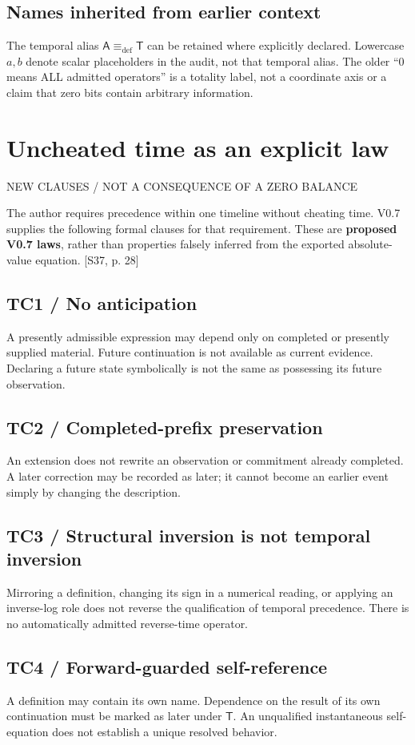 \documentclass[11pt,a4paper]{article}
\newcommand{\newsec}[2]{\clearpage\section{#1}{\sffamily\footnotesize\color{teal}\MakeUppercase{#2}\par}\vspace{5pt}}
\newcommand{\src}[1]{{\small\color{muted}[S37, #1]}}
\newcommand{\Ti}{\mathsf T}
\newcommand{\deq}{\mathrel{\equiv_{\mathrm{def}}}}
\begin{document}
\subsection{Names inherited from earlier context}
The temporal alias $\mathsf A\deq\Ti$ can be retained where explicitly declared. Lowercase $a,b$ denote scalar placeholders in the audit, not that temporal alias. The older ``0 means ALL admitted operators'' is a totality label, not a coordinate axis or a claim that zero bits contain arbitrary information.

\newsec{Uncheated time as an explicit law}{New clauses / not a consequence of a zero balance}
The author requires precedence within one timeline without cheating time. V0.7 supplies the following formal clauses for that requirement. These are \textbf{proposed V0.7 laws}, rather than properties falsely inferred from the exported absolute-value equation. \src{p. 28}

\subsection{TC1 / No anticipation}
A presently admissible expression may depend only on completed or presently supplied material. Future continuation is not available as current evidence. Declaring a future state symbolically is not the same as possessing its future observation.

\subsection{TC2 / Completed-prefix preservation}
An extension does not rewrite an observation or commitment already completed. A later correction may be recorded as later; it cannot become an earlier event simply by changing the description.

\subsection{TC3 / Structural inversion is not temporal inversion}
Mirroring a definition, changing its sign in a numerical reading, or applying an inverse-log role does not reverse the qualification of temporal precedence. There is no automatically admitted reverse-time operator.

\subsection{TC4 / Forward-guarded self-reference}
A definition may contain its own name. Dependence on the result of its own continuation must be marked as later under $\Ti$. An unqualified instantaneous self-equation does not establish a unique resolved behavior.
\end{document}
